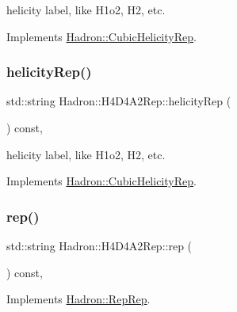 helicity label, like H1o2, H2, etc. 

Implements \mbox{\hyperlink{structHadron_1_1CubicHelicityRep_af1096946b7470edf0a55451cc662f231}{Hadron\+::\+Cubic\+Helicity\+Rep}}.

\mbox{\label{structHadron_1_1H4D4A2Rep_a6f131b590922aebb01c15d0f9a0b9d1b}} 
\subsubsection{\texorpdfstring{helicityRep()}{helicityRep()}\hspace{0.1cm}{\footnotesize\ttfamily [3/3]}}
{\footnotesize\ttfamily std\+::string Hadron\+::\+H4\+D4\+A2\+Rep\+::helicity\+Rep (\begin{DoxyParamCaption}{ }\end{DoxyParamCaption}) const\hspace{0.3cm}{\ttfamily [inline]}, {\ttfamily [virtual]}}

helicity label, like H1o2, H2, etc. 

Implements \mbox{\hyperlink{structHadron_1_1CubicHelicityRep_af1096946b7470edf0a55451cc662f231}{Hadron\+::\+Cubic\+Helicity\+Rep}}.

\mbox{\label{structHadron_1_1H4D4A2Rep_a3964a2a2df9370ac3176d54fa588eb8a}} 
\subsubsection{\texorpdfstring{rep()}{rep()}\hspace{0.1cm}{\footnotesize\ttfamily [1/5]}}
{\footnotesize\ttfamily std\+::string Hadron\+::\+H4\+D4\+A2\+Rep\+::rep (\begin{DoxyParamCaption}{ }\end{DoxyParamCaption}) const\hspace{0.3cm}{\ttfamily [inline]}, {\ttfamily [virtual]}}



Implements \mbox{\hyperlink{structHadron_1_1RepRep_ab3213025f6de249f7095892109575fde}{Hadron\+::\+Rep\+Rep}}.

\mbox{\label{structHadron_1_1H4D4A2Rep_a3964a2a2df9370ac3176d54fa588eb8a}} 

